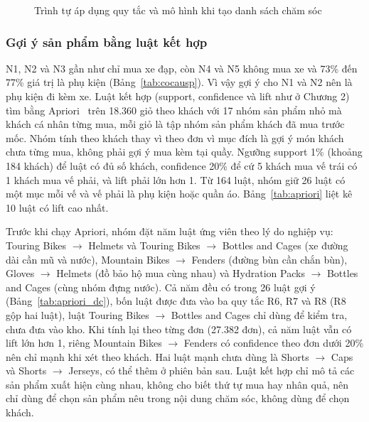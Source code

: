 \begin{figure}[!htbp]
\centering

\caption{Trình tự áp dụng quy tắc và mô hình khi tạo danh sách chăm sóc}
\label{fig:luongquytac}
\end{figure}

\subsubsection{Gợi ý sản phẩm bằng luật kết hợp}
N1, N2 và N3 gần như chỉ mua xe đạp, còn N4 và N5 không mua xe và 73\% đến 77\% giá trị là phụ kiện (Bảng~\ref{tab:cocausp}). Vì vậy gợi ý cho N1 và N2 nên là phụ kiện đi kèm xe. Luật kết hợp (support, confidence và lift như ở Chương 2) tìm bằng Apriori~\cite{han2011} trên 18.360 giỏ theo khách với 17 nhóm sản phẩm nhỏ mà khách cá nhân từng mua, mỗi giỏ là tập nhóm sản phẩm khách đã mua trước mốc. Nhóm tính theo khách thay vì theo đơn vì mục đích là gợi ý món khách chưa từng mua, không phải gợi ý mua kèm tại quầy. Ngưỡng support 1\% (khoảng 184 khách) để luật có đủ số khách, confidence 20\% để cứ 5 khách mua vế trái có 1 khách mua vế phải, và lift phải lớn hơn 1. Từ 164 luật, nhóm giữ 26 luật có một mục mỗi vế và vế phải là phụ kiện hoặc quần áo. Bảng~\ref{tab:apriori} liệt kê 10 luật có lift cao nhất.

\begin{table}[!htbp]
\centering
\caption{Cơ cấu sản phẩm theo nhóm}
\label{tab:cocausp}
\footnotesize

\end{table}

\begin{table}[!htbp]
\centering
\caption{Luật kết hợp dùng làm gợi ý sản phẩm (10 trong 26 luật, xếp theo lift)}
\label{tab:apriori}
\footnotesize

\end{table}

Trước khi chạy Apriori, nhóm đặt năm luật ứng viên theo lý do nghiệp vụ: Touring Bikes $\rightarrow$ Helmets và Touring Bikes $\rightarrow$ Bottles and Cages (xe đường dài cần mũ và nước), Mountain Bikes $\rightarrow$ Fenders (đường bùn cần chắn bùn), Gloves $\rightarrow$ Helmets (đồ bảo hộ mua cùng nhau) và Hydration Packs $\rightarrow$ Bottles and Cages (cùng nhóm đựng nước). Cả năm đều có trong 26 luật gợi ý (Bảng~\ref{tab:apriori_dc}), bốn luật được đưa vào ba quy tắc R6, R7 và R8 (R8 gộp hai luật), luật Touring Bikes $\rightarrow$ Bottles and Cages chỉ dùng để kiểm tra, chưa đưa vào kho. Khi tính lại theo từng đơn (27.382 đơn), cả năm luật vẫn có lift lớn hơn 1, riêng Mountain Bikes $\rightarrow$ Fenders có confidence theo đơn dưới 20\% nên chỉ mạnh khi xét theo khách. Hai luật mạnh chưa dùng là Shorts $\rightarrow$ Caps và Shorts $\rightarrow$ Jerseys, có thể thêm ở phiên bản sau. Luật kết hợp chỉ mô tả các sản phẩm xuất hiện cùng nhau, không cho biết thứ tự mua hay nhân quả, nên chỉ dùng để chọn sản phẩm nêu trong nội dung chăm sóc, không dùng để chọn khách.

